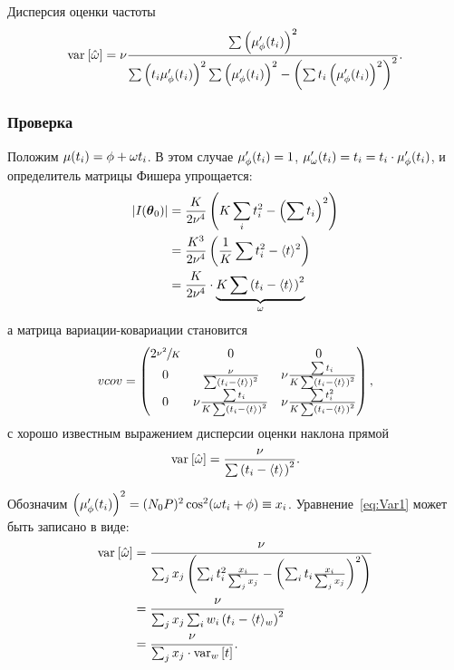 Дисперсия оценки частоты
\begin{equation}\label{eq:Var1}
\var{\hat{\w}} = \nu\frac{\sum\bkt{\mupp}^2}{\sum\bkt{t_i\mupp}^2\sum\bkt{\mupp}^2 - \bkt{\sum t_i\bkt{\mupp}^2}^2}.
\end{equation}

\subsubsection{Проверка} Положим $\mu(t_i) = \phi + \omega t_i$. В этом случае $\mupp = 1$, $\mu'_\w(t_i) = t_i = t_i\cdot\mupp$, и определитель матрицы Фишера упрощается:
\begin{align*}
|\Fisher| &= \frac{K}{2\nu^4}\bkt{K\sum_i t_i^2 - \bkt{\sum t_i}^2} \\
&= \frac{K^3}{2\nu^4}\bkt{\frac1K\sum t_i^2 - \avg{t}^2} \\
&= \frac{K}{2\nu^4}\cdot\underbrace{K\sum\bkt{t_i - \avg{t}}^2}_{\STM}
\end{align*}
\newcommand{\SSX}{\sum\bkt{t_i - \avg{t}}^2}
а матрица вариации-ковариации становится
\[
vcov = \begin{pmatrix}
2\sfrac{\nu^2}{K}& 0									& 0				\\
0				&\frac{\nu}{\SSX}		&\nu\frac{\sum t_i}{K\SSX}\\
0				&\nu\frac{\sum t_i}{K\SSX}	&\nu\frac{\sum t_i^2}{K\SSX}
\end{pmatrix},
\]
с хорошо известным выражением дисперсии оценки наклона прямой
\[
\var{\hat\w} = \frac{\nu}{\SSX}.
\]

Обозначим $\bkt{\mupp}^2 = (N_0P)^2\cos^2(\w t_i + \phi) \equiv x_i$. Уравнение~\eqref{eq:Var1} может быть записано в виде:
\begin{align}
\var{\hat\w} &= \frac{\nu}{\sum_j x_j \bkt{\sum_i t_i^2 \frac{x_i}{\sum_j x_j} - \bkt{\sum_i t_i \frac{x_i}{\sum_j x_j}}^2}} \notag\\
&= \frac{\nu}{\sum_j x_j \sum_i w_i\bkt{t_i - \avg{t}[w]}^2} \notag\\
&= \frac{\nu}{\sum_j x_j \cdot\var[w]{t}}. \label{eq:Var2}
\end{align}



